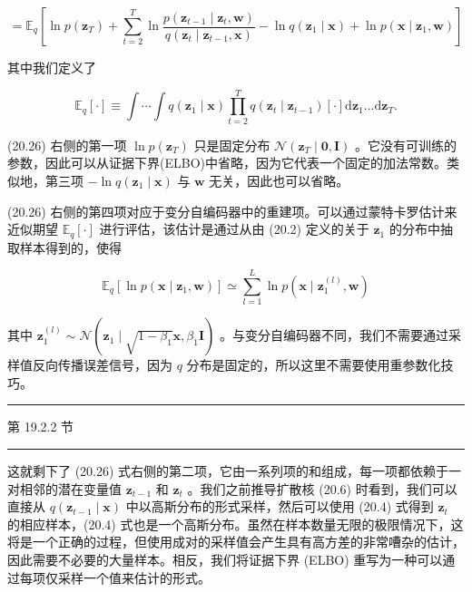 \documentclass[10pt]{report}
\newcommand{\HRule}{\begin{center}\rule{0.9\linewidth}{0.2mm}\end{center}}
\begin{document}
\[
= {\mathbb{E}}_{q}\left\lbrack  {\ln p\left( {\mathbf{z}}_{T}\right)  + \mathop{\sum }\limits_{{t = 2}}^{T}\ln \frac{p\left( {{\mathbf{z}}_{t - 1} \mid  {\mathbf{z}}_{t},\mathbf{w}}\right) }{q\left( {{\mathbf{z}}_{t} \mid  {\mathbf{z}}_{t - 1},\mathbf{x}}\right) } - \ln q\left( {{\mathbf{z}}_{1} \mid  \mathbf{x}}\right)  + \ln p\left( {\mathbf{x} \mid  {\mathbf{z}}_{1},\mathbf{w}}\right) }\right\rbrack   \tag{20.26}
\]

其中我们定义了

\[
{\mathbb{E}}_{q}\left\lbrack  \cdot \right\rbrack   \equiv  \int \cdots \int q\left( {{\mathbf{z}}_{1} \mid  \mathbf{x}}\right) \mathop{\prod }\limits_{{t = 2}}^{T}q\left( {{\mathbf{z}}_{t} \mid  {\mathbf{z}}_{t - 1}}\right) \left\lbrack  \cdot \right\rbrack  \mathrm{d}{\mathbf{z}}_{1}\ldots \mathrm{d}{\mathbf{z}}_{T}. \tag{20.27}
\]

(20.26) 右侧的第一项 \(\ln p\left( {\mathbf{z}}_{T}\right)\) 只是固定分布 \(\mathcal{N}\left( {{\mathbf{z}}_{T} \mid  \mathbf{0},\mathbf{I}}\right)\) 。它没有可训练的参数，因此可以从证据下界(ELBO)中省略，因为它代表一个固定的加法常数。类似地，第三项 \(- \ln q\left( {{\mathbf{z}}_{1} \mid  \mathbf{x}}\right)\) 与 \(\mathbf{w}\) 无关，因此也可以省略。

(20.26) 右侧的第四项对应于变分自编码器中的重建项。可以通过蒙特卡罗估计来近似期望 \({\mathbb{E}}_{q}\left\lbrack  \cdot \right\rbrack\) 进行评估，该估计是通过从由 (20.2) 定义的关于 \({\mathbf{z}}_{1}\) 的分布中抽取样本得到的，使得

\[
{\mathbb{E}}_{q}\left\lbrack  {\ln p\left( {\mathbf{x} \mid  {\mathbf{z}}_{1},\mathbf{w}}\right) }\right\rbrack   \simeq  \mathop{\sum }\limits_{{l = 1}}^{L}\ln p\left( {\mathbf{x} \mid  {\mathbf{z}}_{1}^{\left( l\right) },\mathbf{w}}\right)  \tag{20.28}
\]

其中 \({\mathbf{z}}_{1}^{\left( l\right) } \sim  \mathcal{N}\left( {{\mathbf{z}}_{1} \mid  \sqrt{1 - {\beta }_{1}}\mathbf{x},{\beta }_{1}\mathbf{I}}\right)\) 。与变分自编码器不同，我们不需要通过采样值反向传播误差信号，因为 \(q\) 分布是固定的，所以这里不需要使用重参数化技巧。

\HRule

第 19.2.2 节

\HRule

这就剩下了 (20.26) 式右侧的第二项，它由一系列项的和组成，每一项都依赖于一对相邻的潜在变量值 \({\mathbf{z}}_{t - 1}\) 和 \({\mathbf{z}}_{t}\) 。我们之前推导扩散核 (20.6) 时看到，我们可以直接从 \(q\left( {{\mathbf{z}}_{t - 1} \mid  \mathbf{x}}\right)\) 中以高斯分布的形式采样，然后可以使用 (20.4) 式得到 \({\mathbf{z}}_{t}\) 的相应样本，(20.4) 式也是一个高斯分布。虽然在样本数量无限的极限情况下，这将是一个正确的过程，但使用成对的采样值会产生具有高方差的非常嘈杂的估计，因此需要不必要的大量样本。相反，我们将证据下界 (ELBO) 重写为一种可以通过每项仅采样一个值来估计的形式。
\end{document}
